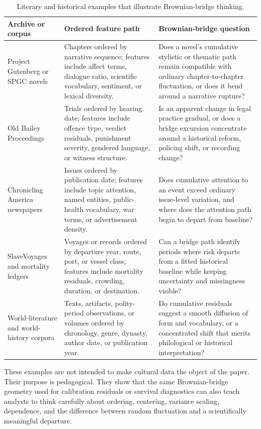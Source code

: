 \documentclass{article}
\theoremstyle{plain}
\theoremstyle{definition}
\begin{document}
\begin{table}[H]
\centering
\small
\caption{Literary and historical examples that illustrate Brownian-bridge thinking.}
\label{tab:literary-history-examples}
\begin{tabularx}{\textwidth}{>{\RaggedRight\arraybackslash}p{}>{\RaggedRight\arraybackslash}p{}>{\RaggedRight\arraybackslash}X}
\toprule
Archive or corpus & Ordered feature path & Brownian-bridge question \\
\midrule
Project Gutenberg or SPGC novels &
Chapters ordered by narrative sequence; features include affect terms, dialogue ratio, scientific vocabulary, sentiment, or lexical diversity. &
Does a novel's cumulative stylistic or thematic path remain compatible with ordinary chapter-to-chapter fluctuation, or does it bend around a narrative rupture? \\
Old Bailey Proceedings &
Trials ordered by hearing date; features include offence type, verdict residuals, punishment severity, gendered language, or witness structure. &
Is an apparent change in legal practice gradual, or does a bridge excursion concentrate around a historical reform, policing shift, or recording change? \\
Chronicling America newspapers &
Issues ordered by publication date; features include topic attention, named entities, public-health vocabulary, war terms, or advertisement density. &
Does cumulative attention to an event exceed ordinary issue-level variation, and where does the attention path begin to depart from baseline? \\
SlaveVoyages and mortality ledgers &
Voyages or records ordered by departure year, route, port, or vessel class; features include mortality residuals, crowding, duration, or destination. &
Can a bridge path identify periods where risk departs from a fitted historical baseline while keeping uncertainty and missingness visible? \\
World-literature and world-history corpora &
Texts, artifacts, polity-period observations, or volumes ordered by chronology, genre, dynasty, author date, or publication year. &
Do cumulative residuals suggest a smooth diffusion of form and vocabulary, or a concentrated shift that merits philological or historical interpretation? \\
\bottomrule
\end{tabularx}
\end{table}

These examples are not intended to make cultural data the object of the
paper. Their purpose is pedagogical. They show that the same Brownian-bridge
geometry used for calibration residuals or survival diagnostics can also
teach analysts to think carefully about ordering, centering, variance
scaling, dependence, and the difference between random fluctuation and a
scientifically meaningful departure.
\end{document}
